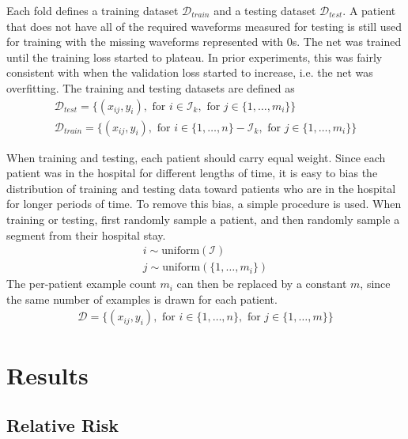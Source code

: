 Each fold defines a training dataset $\mathcal{D}_{train}$ and a testing dataset $\mathcal{D}_{test}$.  A patient that does not have all of the required waveforms measured for testing is still used for training with the missing waveforms represented with 0s.  The net was trained until the training loss started to plateau.  In prior experiments, this was fairly consistent with when the validation loss started to increase, i.e. the net was overfitting. The training and testing datasets are defined as
\begin{gather}
    \mathcal{D}_{test} = \{
        (x_{ij}, y_i),
        \text{ for } i \in \mathcal{I}_k,
        \text{ for } j \in \{ 1, \dots, m_i \}
    \} \\
    \mathcal{D}_{train} = \{
        (x_{ij}, y_i),
        \text{ for } i \in \{1, \dots, n\} - \mathcal{I}_k,
        \text{ for } j \in \{ 1, \dots, m_i \}
    \}
\end{gather}

When training and testing, each patient should carry equal weight.  Since each patient was in the hospital for different lengths of time, it is easy to bias the distribution of training and testing data toward patients who are in the hospital for longer periods of time.  To remove this bias, a simple procedure is used.  When training or testing, first randomly sample a patient, and then randomly sample a segment from their hospital stay.
\begin{gather}
    i \sim \text{uniform}(\mathcal{I}) \\
    j \sim \text{uniform}(\{1, \dots, m_i\})
\end{gather}
The per-patient example count $m_i$ can then be replaced by a constant $m$, since the same number of examples is drawn for each patient.
\begin{gather}
    \mathcal{D} = \{
        (x_{ij}, y_i),
        \text{ for } i \in \{ 1, \dots, n \},
        \text{ for } j \in \{ 1, \dots, m \}
    \}
\end{gather}

\figIcuRelativeRisk
\figIcuActualRisk

\pagebreak
\section{Results}

\subsection{Relative Risk}

